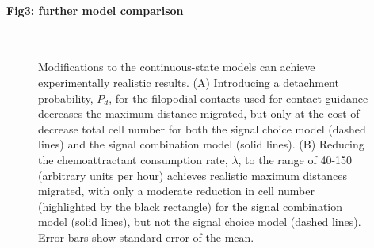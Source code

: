 \documentclass[review]{elsarticle}
\begin{document}
\paragraph{Fig3: further model comparison}
\begin{figure}
\centering
{}\
\caption{Modifications to the continuous-state models can achieve experimentally realistic results. (A) Introducing a detachment probability, $P_d$, for the filopodial contacts used for contact guidance decreases the maximum distance migrated, but only at the cost of decrease total cell number for both the signal choice model (dashed lines) and the signal combination model (solid lines). (B) Reducing the chemoattractant consumption rate, $\lambda$, to the range of 40-150 (arbitrary units per hour) achieves realistic maximum distances migrated, with only a moderate reduction in cell number (highlighted by the black rectangle) for the signal combination model (solid lines), but not the signal choice model (dashed lines). Error bars show standard error of the mean.\label{figFurtherModel}}
\end{figure}
\end{document}
